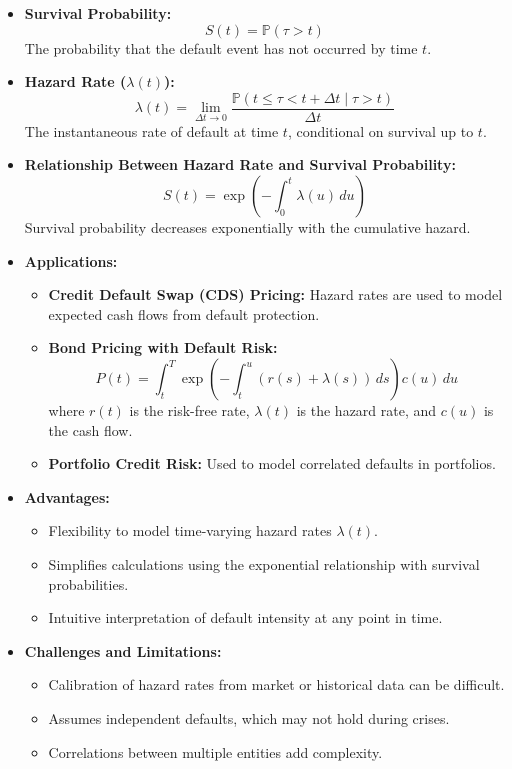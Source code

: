 \documentclass[a4paper,11pt]{book}
\theoremstyle{definition}
\theoremstyle{remark}
\begin{document}
\begin{itemize}
    \item \textbf{Survival Probability:}
    \[
    S(t) = \mathbb{P}(\tau > t)
    \]
    The probability that the default event has not occurred by time \(t\).

    \item \textbf{Hazard Rate (\(\lambda(t)\)):}
    \[
    \lambda(t) = \lim_{\Delta t \to 0} \frac{\mathbb{P}(t \leq \tau < t + \Delta t \mid \tau > t)}{\Delta t}
    \]
    The instantaneous rate of default at time \(t\), conditional on survival up to \(t\).

    \item \textbf{Relationship Between Hazard Rate and Survival Probability:}
    \[
    S(t) = \exp\left(-\int_0^t \lambda(u) \, du\right)
    \]
    Survival probability decreases exponentially with the cumulative hazard.

    \item \textbf{Applications:}
    \begin{itemize}
        \item \textbf{Credit Default Swap (CDS) Pricing:} Hazard rates are used to model expected cash flows from default protection.
        \item \textbf{Bond Pricing with Default Risk:}
        \[
        P(t) = \int_t^T \exp\left(-\int_t^u (r(s) + \lambda(s)) \, ds\right) c(u) \, du
        \]
        where \(r(t)\) is the risk-free rate, \(\lambda(t)\) is the hazard rate, and \(c(u)\) is the cash flow.
        \item \textbf{Portfolio Credit Risk:} Used to model correlated defaults in portfolios.
    \end{itemize}

    \item \textbf{Advantages:}
    \begin{itemize}
        \item Flexibility to model time-varying hazard rates \(\lambda(t)\).
        \item Simplifies calculations using the exponential relationship with survival probabilities.
        \item Intuitive interpretation of default intensity at any point in time.
    \end{itemize}

    \item \textbf{Challenges and Limitations:}
    \begin{itemize}
        \item Calibration of hazard rates from market or historical data can be difficult.
        \item Assumes independent defaults, which may not hold during crises.
        \item Correlations between multiple entities add complexity.
    \end{itemize}
    

\end{itemize}
\end{document}
